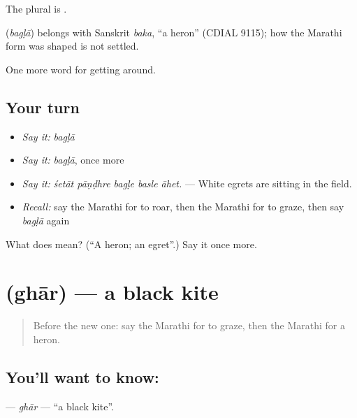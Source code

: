The plural is .

\begin{cousinweb}
\textbf{} (\emph{bagḷā}) belongs with Sanskrit \emph{baka}, \textquotedblleft{}a heron\textquotedblright{} (CDIAL 9115); how the Marathi form was shaped is not settled.
\end{cousinweb}

\begin{grammarlens}[title={What you've built}]
One more word for getting around.
\end{grammarlens}

\subsection*{Your turn}
\begin{itemize}
\raggedright
  \item \emph{Say it:} \emph{bagḷā}
  \item \emph{Say it:} \emph{bagḷā}, once more
  \item \emph{Say it:} \emph{śetāt pāṇḍhre bagḷe basle āhet.} — White egrets are sitting in the field.
  \item \emph{Recall:} say the Marathi for to roar, then the Marathi for to graze, then say \emph{bagḷā} again
\end{itemize}

\begin{tcolorbox}[breakable,colback=teal!4,colframe=teal!35!black,title={Before you move on}]
What does  mean? (\textquotedblleft{}A heron; an egret\textquotedblright{}.) Say it once more.
\end{tcolorbox}
\section[\texorpdfstring{\mr{घार} (ghār)}{घार (ghār)}]{ (ghār) — a black kite}

\label{lesson:MR-C447-ghar}



\begin{quote}
Before the new one: say the Marathi for to graze, then the Marathi for a heron.
\end{quote}

\subsection*{You'll want to know: }
\textbf{} — \emph{ghār} — \textquotedblleft{}a black kite\textquotedblright{}.

